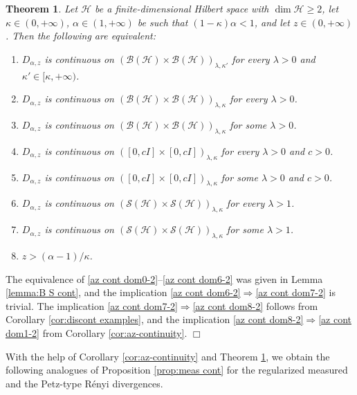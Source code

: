 \documentclass[unsortedaddress,superscriptaddress,pra,notitlepage]{revtex4}
\newtheorem{theorem}[definition]{Theorem}
\newenvironment{proof}[1][Proof]{\begin{trivlist}
\item[\hskip \labelsep {\bfseries #1}]}{\hfill$\Box$\end{trivlist}}
\def\B{{\mathcal B}}
\def\S{{\mathcal S}}
\def\hil{{\mathcal H}}
\def\imp{\Longrightarrow}
\def\pwr{\kappa}
\begin{document}
\begin{theorem}\label{thm:az cont parameters}
Let $\hil$ be a finite-dimensional Hilbert space with $\dim\hil\ge 2$, let 
$\pwr\in(0,+\infty)$, $\alpha\in(1,+\infty)$ be such that 
$(1-\pwr)\alpha<1$, and let 
$z\in(0,+\infty)$. Then the following are equivalent:
\begin{enumerate}
\item\label{az cont dom0-2}
$D_{\alpha,z}$ is continuous on $(\B(\hil)\times\B(\hil))_{\lambda,\pwr'}$ for every $\lambda>0$ and $\pwr'\in[\pwr,+\infty)$.
\item\label{az cont dom1-2}
$D_{\alpha,z}$ is continuous on $(\B(\hil)\times\B(\hil))_{\lambda,\pwr}$ for every $\lambda>0$.
\item\label{az cont dom3-2}
$D_{\alpha,z}$ is continuous on $(\B(\hil)\times\B(\hil))_{\lambda,\pwr}$ for some $\lambda>0$.
\item\label{az cont dom4-1}
$D_{\alpha,z}$ is continuous on $([0,cI]\times[0,cI])_{\lambda,\pwr}$ for every $\lambda>0$ and $c>0$.
\item\label{az cont dom5-2}
$D_{\alpha,z}$ is continuous on $([0,cI]\times[0,cI])_{\lambda,\pwr}$ for some $\lambda>0$ and $c>0$.
\item\label{az cont dom6-2}
$D_{\alpha,z}$ is continuous on $(\S(\hil)\times\S(\hil))_{\lambda,\pwr}$ for every $\lambda>1$.
\item\label{az cont dom7-2}
$D_{\alpha,z}$ is continuous on $(\S(\hil)\times\S(\hil))_{\lambda,\pwr}$ for some $\lambda>1$.
\item\label{az cont dom8-2}
$z>(\alpha-1)/\pwr$.
\end{enumerate}
\end{theorem}
\begin{proof}
The equivalence of \ref{az cont dom0-2}--\ref{az cont dom6-2}
was given in Lemma \ref{lemma:B S cont}, and the implication 
\ref{az cont dom6-2}$\imp$\ref{az cont dom7-2}
is trivial.
The implication 
\ref{az cont dom7-2}$\imp$\ref{az cont dom8-2}
follows from Corollary \ref{cor:discont examples}, and the implication 
\ref{az cont dom8-2}$\imp$\ref{az cont dom1-2}
from Corollary \ref{cor:az-continuity}.
\end{proof}
\medskip

With the help of Corollary \ref{cor:az-continuity} and Theorem \ref{thm:az cont parameters}, we obtain the following analogues of Proposition \ref{prop:meas cont} for the regularized measured and the Petz-type R\'enyi divergences.
\end{document}
